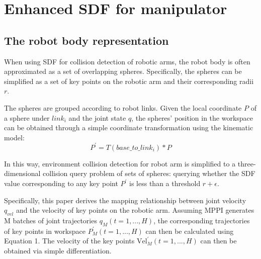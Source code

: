 \documentclass{article}
\begin{document}
	\section{Enhanced SDF for manipulator}
	\subsection{The robot body representation}
	
	When using SDF for collision detection of robotic arms, the robot body is often approximated as a set of overlapping spheres. Specifically, the spheres can be simplified as a set of key points on the robotic arm and their corresponding radii $r$.
	
	The spheres are grouped according to robot links. Given the local coordinate $P$ of a sphere under $link_i$ and the joint state $q$, the spheres' position in the workspace can be obtained through a simple coordinate transformation using the kinematic model:
	\[P^{'} = T(base\_to\_link_{i}) * P\]
	
	In this way, environment collision detection for robot arm  is simplified to a three-dimensional collision query problem of sets of spheres: querying whether the SDF value corresponding to any key point $P^{'}$ is less than a threshold $r+\epsilon$.
	
	Specifically, this paper derives the mapping relationship between joint velocity $q_{vel}$ and the velocity of key points on the robotic arm. Assuming MPPI generates M batches of joint trajectories $q_{M}(t=1,...,H)$, the corresponding trajectories of key points in workspace $P_{M}^{'}(t=1,...,H)$ can then be calculated using Equation 1. The velocity of the key points $\text{Vel}_{M}^{'}(t=1,...,H)$ can then be obtained via simple differentiation.
	
\end{document}
